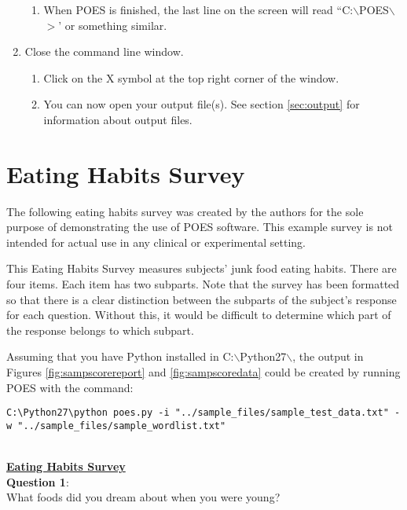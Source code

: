 \documentclass[11pt]{article}
\newcommand{\bsl}{$\backslash$}
\numberwithin{figure}{section}
\numberwithin{table}{section}
\begin{document}
\begin{enumerate}
\begin{enumerate}
\item When POES is finished, the last line on the screen will read ``C:\bsl{}POES\bsl{}$>$' or something similar.
\end{enumerate}
\item Close the command line window.
\begin{enumerate}
\item Click on the X symbol at the top right corner of the window.
\item You can now open your output file(s).  See section \ref{sec:output} for \\information about output files.
\end{enumerate}
\end{enumerate}


\newpage\appendix
\section{Eating Habits Survey}
\label{app:eatinghabits}

The following eating habits survey was created by the authors for the sole purpose of demonstrating the use of POES software.  This example survey is not intended for actual use in any clinical or experimental setting.

This Eating Habits Survey measures subjects' junk food eating habits.  There are four items.  Each item has two subparts.  Note that the survey has been formatted so that there is a clear distinction between the subparts of the subject's response for each question.  Without this, it would be difficult to determine which part of the response belongs to which subpart.

Assuming that you have Python installed in C:\bsl{}Python27\bsl{}, the output in Figures \ref{fig:sampscorereport} and \ref{fig:sampscoredata} could be created by running POES with the command:\begin{verbatim}
C:\Python27\python poes.py -i "../sample_files/sample_test_data.txt" -w "../sample_files/sample_wordlist.txt"
\end{verbatim}
\normalsize ~\\

\noindent\underline{\textbf{Eating Habits Survey}}\\

\noindent\textbf{Question 1}: \\
\noindent What foods did you dream about when you were young?  \\
~\\
\end{document}
